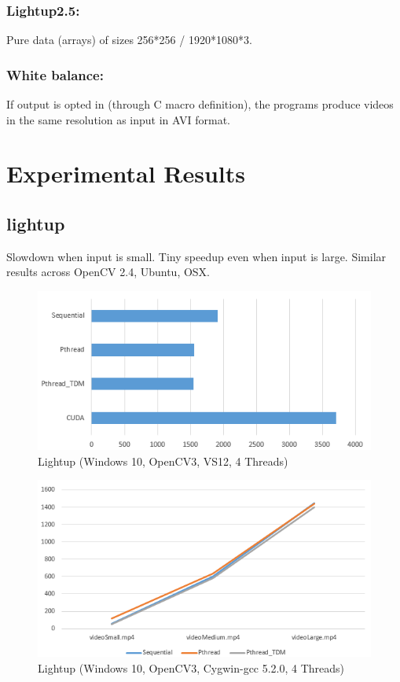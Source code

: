 \documentclass{acm_proc_article-sp}
\begin{document}
\subsubsection{Lightup2.5:}
Pure data (arrays) of sizes 256*256 / 1920*1080*3.
\subsubsection{White balance:}
If output is opted in (through C macro definition), the programs produce videos in the same resolution as input in AVI format. 

\section{Experimental Results}
\subsection{lightup}
Slowdown when input is small. Tiny speedup even when input is large. Similar results across OpenCV 2.4, Ubuntu, OSX.
\begin{figure}[H]
  \includegraphics[width=\linewidth,natwidth=577,natheight=305]{lightup.png}
  \caption{Lightup (Windows 10, OpenCV3, VS12, 4 Threads)}
  \label{fig:lightup}
\end{figure}
\begin{figure}[H]
  \includegraphics[width=\linewidth,natwidth=579,natheight=307]{lightup_sml.png}
  \caption{Lightup (Windows 10, OpenCV3, Cygwin-gcc 5.2.0, 4 Threads)}
  \label{fig:lightup_sml}
\end{figure}
\end{document}
